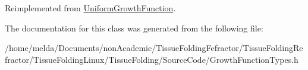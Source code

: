 Reimplemented from \hyperlink{classUniformGrowthFunction_a57d05e0d05812b77eac2fd6ca099bd26}{Uniform\+Growth\+Function}.



The documentation for this class was generated from the following file\+:\begin{DoxyCompactItemize}
\item 
/home/melda/\+Documents/non\+Academic/\+Tissue\+Folding\+Fefractor/\+Tissue\+Folding\+Refractor/\+Tissue\+Folding\+Linux/\+Tissue\+Folding/\+Source\+Code/Growth\+Function\+Types.\+h\end{DoxyCompactItemize}
